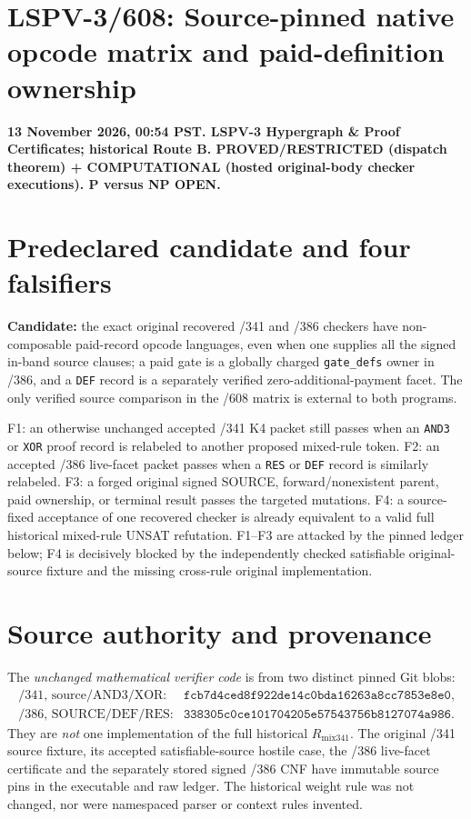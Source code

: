 \documentclass[11pt]{article}
\begin{document}
\section*{LSPV-3/608: Source-pinned native opcode matrix and paid-definition ownership}
\noindent\textbf{13 November 2026, 00:54 PST. LSPV-3 Hypergraph \& Proof Certificates; historical Route B. PROVED/RESTRICTED (dispatch theorem) + COMPUTATIONAL (hosted original-body checker executions). P versus NP OPEN.}

\section*{Predeclared candidate and four falsifiers}
\textbf{Candidate:} the exact original recovered /341 and /386 checkers have non-composable paid-record opcode languages, even when one supplies all the signed in-band source clauses; a paid gate is a globally charged \texttt{gate\_defs} owner in /386, and a \texttt{DEF} record is a separately verified zero-additional-payment facet. The only verified source comparison in the /608 matrix is external to both programs.
\par
F1: an otherwise unchanged accepted /341 K4 packet still passes when an \texttt{AND3} or \texttt{XOR} proof record is relabeled to another proposed mixed-rule token. F2: an accepted /386 live-facet packet passes when a \texttt{RES} or \texttt{DEF} record is similarly relabeled. F3: a forged original signed SOURCE, forward/nonexistent parent, paid ownership, or terminal result passes the targeted mutations. F4: a source-fixed acceptance of one recovered checker is already equivalent to a valid full historical mixed-rule UNSAT refutation. F1--F3 are attacked by the pinned ledger below; F4 is decisively blocked by the independently checked satisfiable original-source fixture and the missing cross-rule original implementation.

\section*{Source authority and provenance}
The \emph{unchanged mathematical verifier code} is from two distinct pinned Git blobs:
\[
\begin{array}{ll}
\text{/341, source/AND3/XOR:}&\texttt{fcb7d4ced8f922de14c0bda16263a8cc7853e8e0},\\
\text{/386, SOURCE/DEF/RES:}&\texttt{338305c0ce101704205e57543756b8127074a986}.
\end{array}
\]
They are \emph{not} one implementation of the full historical $R_{\mathrm{mix341}}$. The original /341 source fixture, its accepted satisfiable-source hostile case, the /386 live-facet certificate and the separately stored signed /386 CNF have immutable source pins in the executable and raw ledger. The historical weight rule was not changed, nor were namespaced parser or context rules invented.
\end{document}
